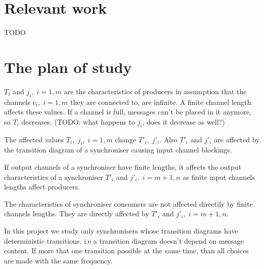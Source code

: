 \section{Relevant work}
TODO

\section{The plan of study}
$T_{i}$ and $j_{i}, \; i=1,m$ are the characteristics of producers in assumption that the channels $c_{i}, \; i=1,m$ they are connected to, are infinite. A finite channel length affects these values. If a channel is full, messages can't be placed in it anymore, so $T_{i}$ decreases. (TODO: what happens to $j_{i}$, does it decrease as well?)

The affected values $T_{i}, \; j_{i}, \; i=1,m$ change $T'_{i}, \; j'_{i}$. Also $T'_{i}$ and $j'_{i}$ are affected by the transition diagram of a synchroniser causing input channel blockings.

If output channels of a synchroniser have finite lengths, it affects the output characteristics of a synchroniser $T'_{i}$ and $j'_{i}, \; i=m+1,n$ as finite input channels lengths affect producers.

The characteristics of synchroniser consumers are not affected directily by finite channels lengths. They are directly affected by $T'_{i}$ and $j'_{i}, \; i=m+1,n$.


In this project we study only synchronisers whose transition diagrams have deterministic transitions, i.e a transition diagram doesn't depend on message content. If more that one transition possible at the same time, than all choices are made with the same frequency.


